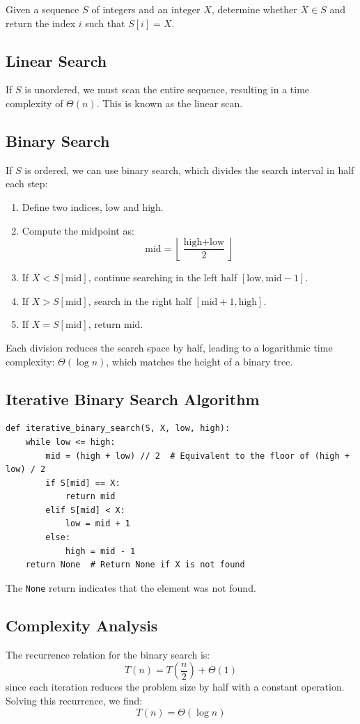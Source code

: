 Given a sequence \(S\) of integers and an integer \(X\), determine whether \(X \in S\) and return the index \(i\) such that \(S[i] = X\).

\subsection{Linear Search}
If \(S\) is unordered, we must scan the entire sequence, resulting in a time complexity of \(\Theta(n)\). This is known as the linear scan.

\subsection{Binary Search}
If \(S\) is ordered, we can use binary search, which divides the search interval in half each step:
\begin{enumerate}
    \item Define two indices, \( \text{low} \) and \( \text{high} \).
    \item  Compute the midpoint as:
   \[
   \text{mid} = \left\lfloor \frac{\text{high} + \text{low}}{2} \right\rfloor
   \]
    \item If \(X < S[\text{mid}]\), continue searching in the left half \([ \text{low}, \text{mid} - 1 ]\).
    \item If \(X > S[\text{mid}]\), search in the right half \([ \text{mid} + 1, \text{high} ]\).
    \item If \(X = S[\text{mid}]\), return \(\text{mid}\).
\end{enumerate}
Each division reduces the search space by half, leading to a logarithmic time complexity: \(\Theta(\log n)\), which matches the height of a binary tree.

\subsection{Iterative Binary Search Algorithm}

\begin{verbatim}
def iterative_binary_search(S, X, low, high):
    while low <= high:
        mid = (high + low) // 2  # Equivalent to the floor of (high + low) / 2
        if S[mid] == X:
            return mid
        elif S[mid] < X:
            low = mid + 1
        else:
            high = mid - 1
    return None  # Return None if X is not found
\end{verbatim}

The \texttt{None} return indicates that the element was not found.

\subsection{Complexity Analysis}
The recurrence relation for the binary search is:
\[
T(n) = T\left(\frac{n}{2}\right) + \Theta(1)
\]
since each iteration reduces the problem size by half with a constant operation. Solving this recurrence, we find:
\[
T(n) = \Theta(\log n)
\]

\newpage
